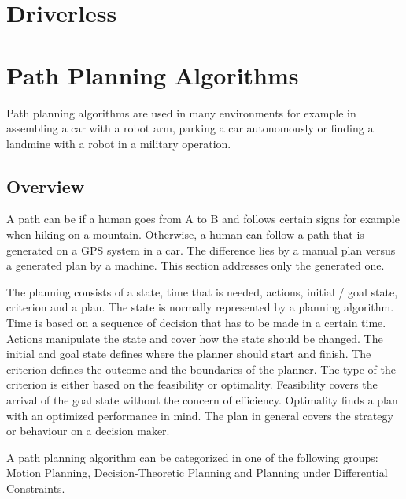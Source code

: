\section{Driverless} \label{sec:Driverless}
\lipsum[1]

\section{Path Planning Algorithms} \label{sec:Path Planning Algorithms}
Path planning algorithms are used in many environments for example in assembling a car with a robot arm, parking a car autonomously or finding a landmine with a robot in a military operation. 

\subsection{Overview} \label{sec:Overview Path Planning Algorithms}
A path can be if a human goes from A to B and follows certain signs for example when hiking on a mountain. Otherwise, a human can follow a path that is generated on a GPS system in a car. The difference lies by a manual plan versus a generated plan by a machine. This section addresses only the generated one.

The planning consists of a state, time that is needed, actions, initial / goal state, criterion and a plan. The state is normally represented by a planning algorithm. Time is based on a sequence of decision that has to be made in a certain time. Actions manipulate the state and cover how the state should be changed. The initial and goal state defines where the planner should start and finish.
The criterion defines the outcome and the boundaries of the planner. The type of the criterion is either based on the feasibility or optimality. Feasibility covers the arrival of the goal state without the concern of efficiency. Optimality finds a plan with an optimized performance in mind. The plan in general covers the strategy or behaviour on a decision maker. \cite{planning_algorithms_steven_m_lavalle}

A path planning algorithm can be categorized in one of the following groups: Motion Planning, Decision-Theoretic Planning and Planning under Differential Constraints.
\cite{planning_algorithms_steven_m_lavalle}

